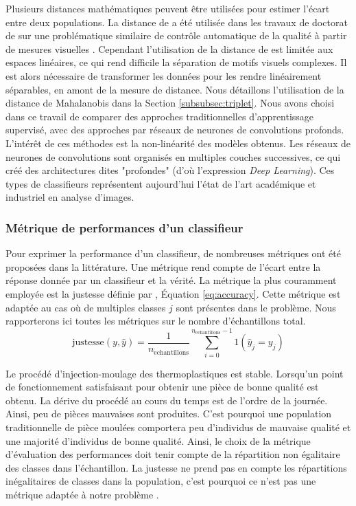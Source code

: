 Plusieurs distances mathématiques peuvent être utilisées pour estimer l'écart entre deux populations.
La distance de \citeauthor{mahalanobis_generalised_1936} \cite{mahalanobis_generalised_1936} a été utilisée dans les travaux de doctorat de \citeauthor{lacombe_exploitation_2018a} sur une problématique similaire de contrôle automatique de la qualité à partir de mesures visuelles \cite{lacombe_exploitation_2018a}.
Cependant l'utilisation de la distance de \citeauthor{mahalanobis_generalised_1936} est limitée aux espaces linéaires, ce qui rend difficile la séparation de motifs visuels complexes.
Il est alors nécessaire de transformer les données pour les rendre linéairement séparables, en amont de la mesure de distance.
Nous détaillons l'utilisation de la distance de Mahalanobis dans la Section \ref{subsubsec:triplet}.
Nous avons choisi dans ce travail de comparer des approches traditionnelles d'apprentissage supervisé, avec des approches par réseaux de neurones de convolutions profonds.
L'intérêt de ces méthodes est la non-linéarité des modèles obtenus.
Les réseaux de neurones de convolutions sont organisés en multiples couches successives, ce qui créé des architectures dites "profondes" (d'où l'expression \textit{Deep Learning}).
Ces types de classifieurs représentent aujourd'hui l'état de l'art académique et industriel en analyse d'images.

\subsubsection{Métrique de performances d'un classifieur}
Pour exprimer la performance d'un classifieur, de nombreuses métriques ont été proposées dans la littérature.
Une métrique rend compte de l'écart entre la réponse donnée par un classifieur et la vérité.
La métrique la plus couramment employée est la justesse définie par \citeauthor{metz_basic_1978} \cite{metz_basic_1978}, Équation \ref{eq:accuracy}.
Cette métrique est adaptée au cas où de multiples classes $j$ sont présentes dans le problème.
Nous rapporterons ici toutes les métriques sur le nombre d'échantillons total.
\begin{equation} \label{eq:accuracy}
\text{justesse}(y, \hat{y})=\frac{1}{n_{\mathrm{\acute{e}chantillons}}} \sum_{i=0}^{n_{\mathrm{\acute{e}chantillons}}-1} 1\left(\hat{y}_{j}=y_{j}\right)
\end{equation}

Le procédé d'injection-moulage des thermoplastiques est stable.
Lorsqu'un point de fonctionnement satisfaisant pour obtenir une pièce de bonne qualité est obtenu.
La dérive du procédé au cours du temps est de l'ordre de la journée.
Ainsi, peu de pièces mauvaises sont produites.
C'est pourquoi une population traditionnelle de pièce moulées comportera peu d'individus de mauvaise qualité et une majorité d'individus de bonne qualité.
Ainsi, le choix de la métrique d'évaluation des performances doit tenir compte de la répartition non égalitaire des classes dans l'échantillon.
La justesse ne prend pas en compte les répartitions inégalitaires de classes dans la population, c'est pourquoi ce n'est pas une métrique adaptée à notre problème \cite{japkowicz_class_2002}.

